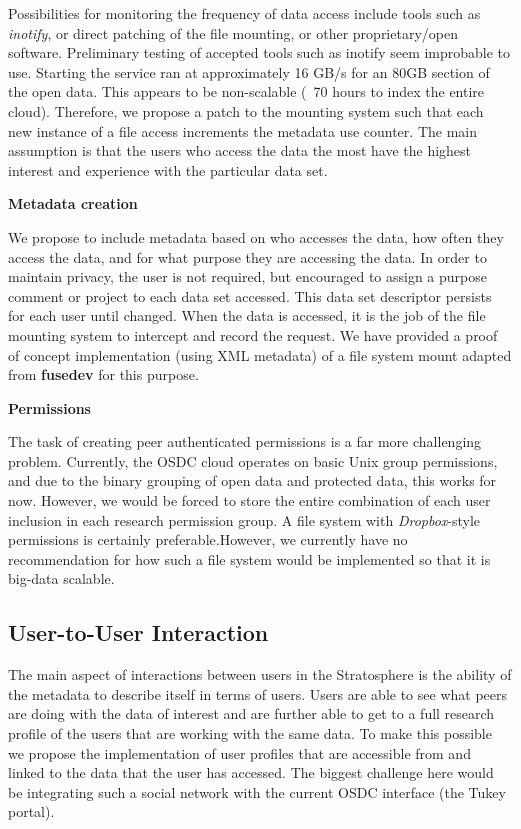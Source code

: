 \begin{multicols*}{2}
Possibilities for monitoring the frequency of data access include
tools such as \textit{inotify}, or direct patching of the file
mounting, or other proprietary/open software.  Preliminary testing of
accepted tools such as inotify seem improbable to use.  Starting the
service ran at approximately 16 GB/s for an 80GB section of the open
data. This appears to be non-scalable (~70 hours to index the entire
cloud). Therefore, we propose a patch to the mounting system such that
each new instance of a file access increments the metadata use
counter.  The main assumption is that the users who access the data
the most have the highest interest and experience with the particular
data set.

\textbf{Metadata creation}

We propose to include metadata based on who accesses the data, how
often they access the data, and for what purpose they are accessing
the data.  In order to maintain privacy, the user is not required, but
encouraged to assign a purpose comment or project to each data set
accessed. This data set descriptor persists for each user until
changed.  When the data is accessed, it is the job of the file
mounting system to intercept and record the request.  We have provided
a proof of concept implementation (using XML metadata) of a file
system mount adapted from \textbf{fusedev} for this purpose.

\textbf{Permissions}

The task of creating peer authenticated permissions is a far more
challenging problem. Currently, the OSDC cloud operates on basic Unix
group permissions, and due to the binary grouping of open data and
protected data, this works for now. However, we would be forced to
store the entire combination of each user inclusion in each research
permission group. A file system with \textit{Dropbox}-style
permissions is certainly preferable.However, we currently have no
recommendation for how such a file system would be implemented so that
it is big-data scalable.

\subsection{User-to-User Interaction}

The main aspect of interactions between users in the Stratosphere is
the ability of the metadata to describe itself in terms of
users. Users are able to see what peers are doing with the data of
interest and are further able to get to a full research profile of the
users that are working with the same data. To make this possible we
propose the implementation of user profiles that are accessible from
and linked to the data that the user has accessed. The biggest
challenge here would be integrating such a social network with the
current OSDC interface (the Tukey portal).


\end{multicols*}

